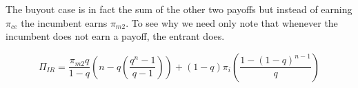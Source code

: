 \documentclass[11pt]{article}
\begin{document}
The buyout case is in fact the sum of the other two payoffs but instead of earning $\pi_{ce}$ the incumbent earns $\pi_{m2}$. To see why we need only note that whenever the incumbent does not earn a payoff, the entrant does. 

\begin{equation*}
\Pi_{IR} = \frac{\pi_{m2} q}{1-q} \left(n-q (\frac{q^n-1}{q-1}) \right)
+(1-q)\pi_i \left(\frac{1-(1-q)^{n-1}}{q} \right)
\end{equation*}

\newpage


\end{document}
